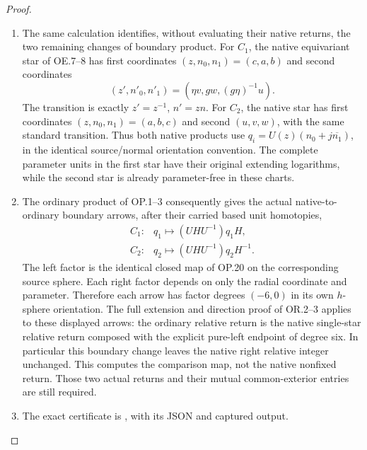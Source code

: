 \begin{proof}
\begin{enumerate}[label=\arabic*.]
\par

\medskip\noindent\textbf{OR.4. The two exact nonfixed single-star frame comparisons}

\par\nobreak

\item The same calculation identifies, without evaluating their native
returns, the two remaining changes of boundary product. For \(C_1\),
the native equivariant star of OE.7--8 has first coordinates
\((z,n_0,n_1)=(c,a,b)\) and second coordinates
\[
 (z',n'_0,n'_1)=(\eta v,g w,(g\eta)^{-1}u).
\]
The transition is exactly \(z'=z^{-1}\), \(n'=zn\).
For \(C_2\), the native star has first coordinates
\((z,n_0,n_1)=(a,b,c)\) and second \((u,v,w)\), with the
same standard transition. Thus both native products use
\(q_i=U(z)(n_0+j\overline{n_1})\), in the identical source/normal
orientation convention. The complete parameter units in the first
star have their original extending logarithms, while the second
star is already parameter-free in these charts.

\item The ordinary product of OP.1--3 consequently gives the actual
native-to-ordinary boundary arrows, after their carried based unit
homotopies,
\[
 \begin{array}{ll}
 C_1:&q_1\longmapsto (UHU^{-1})q_1 H,\\
 C_2:&q_2\longmapsto (UHU^{-1})q_2 H^{-1}.
 \end{array}                                             \tag{OR.11}
\]
The left factor is the identical closed map of OP.20 on the
corresponding source sphere. Each right factor depends on only the
radial coordinate and parameter. Therefore each arrow has factor
degrees \((-6,0)\) in its own \(h\)-sphere orientation. The full
extension and direction proof of OR.2--3 applies to these displayed
arrows: the ordinary relative return is the native single-star
relative return composed with the explicit pure-left endpoint of
degree six. In particular this boundary change leaves the native
right relative integer unchanged. This computes the comparison
map, not the native nonfixed return. Those two actual returns and
their mutual common-exterior entries are still required.

\item The exact certificate is , with its JSON and captured output.

\end{enumerate}
\end{proof}